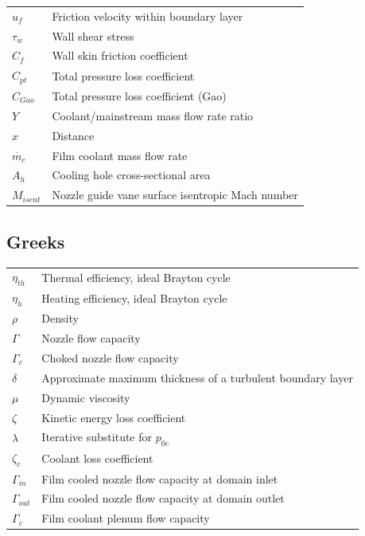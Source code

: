 \documentclass[a4paper, 11pt, oneside]{report}
\begin{document}
\begin{table}[H]
\begin{center}
\begin{tabular}{ll}
$u_f$ & Friction velocity within boundary layer \\
$\tau_w$ & Wall shear stress \\
$C_f$ & Wall skin friction coefficient \\
$C_{pt}$ & Total pressure loss coefficient \\
$C_{Gao}$ & Total pressure loss coefficient (Gao) \\
$Y$ & Coolant/mainstream mass flow rate ratio \\
$x$ & Distance \\
$\dot{m_c}$ & Film coolant mass flow rate \\
$A_h$ & Cooling hole cross-sectional area \\
$M_{isent}$ & Nozzle guide vane surface isentropic Mach number
\end{tabular}
\end{center}
\end{table}

\subsection*{Greeks}
\begin{table}[H]
\begin{center}
\begin{tabular}{ll}
$\eta_{th}$ & Thermal efficiency, ideal Brayton cycle \\
$\eta_h$ & Heating efficiency, ideal Brayton cycle \\
$\rho$ & Density \\
$\Gamma$ & Nozzle flow capacity \\
$\Gamma_c$ & Choked nozzle flow capacity \\
$\delta$ & Approximate maximum thickness of a turbulent boundary layer \\
$\mu$ & Dynamic viscosity \\
$\zeta$ & Kinetic energy loss coefficient \\
$\lambda$ & Iterative substitute for $p_{0c}$ \\
$\zeta_c$ & Coolant loss coefficient \\
$\Gamma_{in}$ & Film cooled nozzle flow capacity at domain inlet \\
$\Gamma_{out}$ & Film cooled nozzle flow capacity at domain outlet \\
$\Gamma_c$ & Film coolant plenum flow capacity
\end{tabular}
\end{center}
\end{table}
\end{document}

